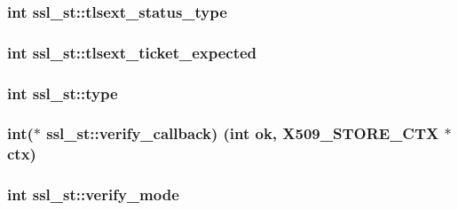 \subsubsection[{\texorpdfstring{tlsext\+\_\+status\+\_\+type}{tlsext_status_type}}]{\setlength{\rightskip}{0pt plus 5cm}int ssl\+\_\+st\+::tlsext\+\_\+status\+\_\+type}\hypertarget{structssl__st_aba46c200c19caf4051d001f5ca0475e3}{}\label{structssl__st_aba46c200c19caf4051d001f5ca0475e3}
\subsubsection[{\texorpdfstring{tlsext\+\_\+ticket\+\_\+expected}{tlsext_ticket_expected}}]{\setlength{\rightskip}{0pt plus 5cm}int ssl\+\_\+st\+::tlsext\+\_\+ticket\+\_\+expected}\hypertarget{structssl__st_ac3163b212ec333ebcfba794e683be1d2}{}\label{structssl__st_ac3163b212ec333ebcfba794e683be1d2}
\subsubsection[{\texorpdfstring{type}{type}}]{\setlength{\rightskip}{0pt plus 5cm}int ssl\+\_\+st\+::type}\hypertarget{structssl__st_a5d2a229f22c169bd5eecefd9f017e089}{}\label{structssl__st_a5d2a229f22c169bd5eecefd9f017e089}
\subsubsection[{\texorpdfstring{verify\+\_\+callback}{verify_callback}}]{\setlength{\rightskip}{0pt plus 5cm}int($\ast$ ssl\+\_\+st\+::verify\+\_\+callback) (int ok, {\bf X509\+\_\+\+S\+T\+O\+R\+E\+\_\+\+C\+TX} $\ast${\bf ctx})}\hypertarget{structssl__st_a5891d1f44fd1385ae1c1c4e866450133}{}\label{structssl__st_a5891d1f44fd1385ae1c1c4e866450133}
\subsubsection[{\texorpdfstring{verify\+\_\+mode}{verify_mode}}]{\setlength{\rightskip}{0pt plus 5cm}int ssl\+\_\+st\+::verify\+\_\+mode}\hypertarget{structssl__st_a7592fd603fe469b789f13bdbc55a172e}{}\label{structssl__st_a7592fd603fe469b789f13bdbc55a172e}
